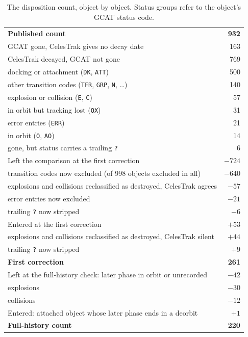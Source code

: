 \begin{table}[h]
\centering
\small
\caption{The disposition count, object by object. Status groups refer to the
object's GCAT status code.}
\label{tab:ledger}
\begin{tabular}{lr}
\toprule
\textbf{Published count} & \textbf{932} \\
\quad GCAT gone, CelesTrak gives no decay date & 163 \\
\quad CelesTrak decayed, GCAT not gone & 769 \\
\qquad docking or attachment (\texttt{DK}, \texttt{ATT}) & 500 \\
\qquad other transition codes (\texttt{TFR}, \texttt{GRP}, \texttt{N}, \ldots) & 140 \\
\qquad explosion or collision (\texttt{E}, \texttt{C}) & 57 \\
\qquad in orbit but tracking lost (\texttt{OX}) & 31 \\
\qquad error entries (\texttt{ERR}) & 21 \\
\qquad in orbit (\texttt{O}, \texttt{AO}) & 14 \\
\qquad gone, but status carries a trailing \texttt{?} & 6 \\
\midrule
Left the comparison at the first correction & $-724$ \\
\quad transition codes now excluded (of 998 objects excluded in all) & $-640$ \\
\quad explosions and collisions reclassified as destroyed, CelesTrak agrees & $-57$ \\
\quad error entries now excluded & $-21$ \\
\quad trailing \texttt{?} now stripped & $-6$ \\
Entered at the first correction & $+53$ \\
\quad explosions and collisions reclassified as destroyed, CelesTrak silent & $+44$ \\
\quad trailing \texttt{?} now stripped & $+9$ \\
\textbf{First correction} & \textbf{261} \\
\midrule
Left at the full-history check: later phase in orbit or unrecorded & $-42$ \\
\quad explosions & $-30$ \\
\quad collisions & $-12$ \\
Entered: attached object whose later phase ends in a deorbit & $+1$ \\
\textbf{Full-history count} & \textbf{220} \\
\bottomrule
\end{tabular}
\end{table}

